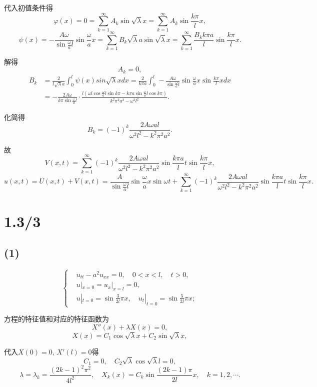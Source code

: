 \documentclass[11pt,a4paper]{article}
\begin{document}
代入初值条件得
$$\varphi(x)=0=\sum_{k=1}^\infty A_k\sin\sqrt{\lambda}x=\sum_{k=1}^\infty A_k\sin\frac{k\pi }{l}x,$$
$$\psi(x)=-\frac{A\omega}{\sin\frac{\omega}{a}l}\sin\frac{\omega}{a}x=\sum_{k=1}^\infty B_k\sqrt{\lambda}a\sin\sqrt{\lambda}x=\sum_{k=1}^\infty \frac{B_kk\pi a}{l}\sin\frac{k\pi}{l}x.$$

解得
$$A_k=0,$$
\begin{align*}
  B_k & =\frac{2}{l\sqrt{\lambda}a}\int_0^l\psi(x)sin\sqrt{\lambda}xdx=
  \frac{2}{k\pi a}\int_0^l -\frac{A\omega}{\sin\frac{\omega}{a}l}\sin\frac{\omega}{a}x\sin\frac{k\pi}{l}xdx                                                                         \\
      & =-\frac{2A\omega}{k\pi\sin\frac{\omega}{a}l}\cdot\frac{l\left(\omega l\cos\frac{\omega}{a}l\sin k\pi-k\pi a\sin\frac{\omega}{a}l\cos k\pi\right)}{k^2\pi^2a^2-\omega^2l^2}.
\end{align*}

化简得
$$B_k=(-1)^k\frac{2A\omega al}{\omega^2l^2-k^2\pi^2a^2}.$$

故
$$V(x,t)=\sum_{k=1}^\infty(-1)^k\frac{2A\omega al}{\omega^2l^2-k^2\pi^2a^2}\sin\frac{k\pi a}{l}t\sin\frac{k\pi}{l}x,$$
$$u(x,t)=U(x,t)+V(x,t)=\frac{A}{\sin\frac{\omega}{a}l}\sin\frac{\omega}{a}x\sin\omega t+\sum_{k=1}^\infty(-1)^k\frac{2A\omega al}{\omega^2l^2-k^2\pi^2a^2}\sin\frac{k\pi a}{l}t\sin\frac{k\pi}{l}x.$$

\section{1.3/3}

\subsection*{(1)}

$$
  \left\{\begin{aligned}
     & u_{tt}-a^2u_{xx}=0, \quad 0<x<l,\quad t>0,                             \\
     & u|_{x=0}=u_x|_{x=l}=0,                                                 \\
     & u|_{t=0}=\sin\frac{3}{2l}\pi x,\quad u_t|_{t=0}=\sin\frac{5}{2l}\pi x;
  \end{aligned}\right.
$$

方程的特征值和对应的特征函数为
$$X''(x)+\lambda X(x)=0,$$
$$X(x)=C_1\cos\sqrt{\lambda}x+C_2\sin\sqrt{\lambda}x,$$

代入$X(0)=0$, $X'(l)=0$得
$$C_1=0,\quad C_2\sqrt{\lambda}\cos\sqrt{\lambda}l=0,$$
$$\lambda=\lambda_k=\frac{(2k-1)^2\pi^2}{4l^2},\quad X_k(x)=C_k\sin\frac{(2k-1)\pi}{2l}x,\quad k=1,2,\cdots.$$
\end{document}
